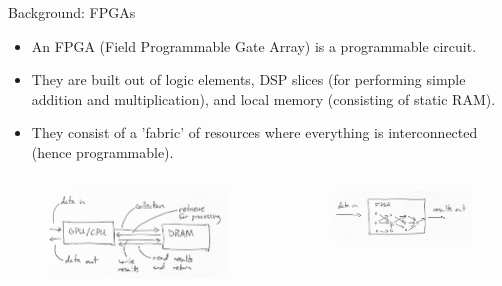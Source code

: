 \documentclass[aspectratio=169,xcolor=dvipsnames]{beamer}
\begin{document}
\begin{frame}{Background: FPGAs}
    \begin{itemize}
        \item An FPGA (Field Programmable Gate Array) is a programmable circuit.
        \item They are built out of logic elements, DSP slices (for performing simple addition and multiplication), and local memory (consisting of static RAM).
        \item They consist of a 'fabric' of resources where everything is interconnected (hence programmable).
    \end{itemize}
    \begin{columns}
        \begin{column}{0.48\textwidth}
            \begin{figure}
                \centering
                \includegraphics[width=\textwidth]{gpucpu.png}
            \end{figure}
        \end{column}
        \begin{column}{0.48\textwidth}
            \begin{figure}
                \centering
                \includegraphics[width=\textwidth]{fpga.png}
            \end{figure}
        \end{column}
    \end{columns}
\end{frame}
\end{document}
